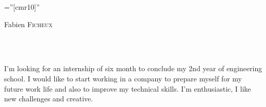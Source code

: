 \documentclass[a4paper,10pt]{article}
\begin{document}

\pagestyle{empty} %

\font\fb=''[cmr10]'' %

\par{\centering
		{\Huge Fabien \textsc{Ficheux}
	}\bigskip\par}

    \\
    \\
    
    
 \bigskip
\par   I'm looking for an internship of six month to conclude my 2nd year of engineering school. I would like to start working in a company to prepare myself for my future work life and also to improve my technical skills. I'm enthusiastic, I like new challenges and creative.\par

\end{document}
